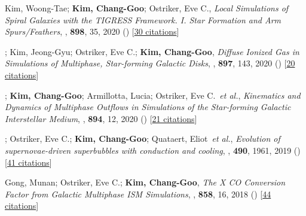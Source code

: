 \item[{14.}]Kim, Woong-Tae; \textbf{Kim, Chang-Goo}; Ostriker, Eve C., \textit{Local Simulations of Spiral Galaxies with the TIGRESS Framework. I. Star Formation and Arm Spurs/Feathers}, , \textbf{898}, 35, 2020 () [\href{http://adsabs.harvard.edu/abs/2020ApJ...898...35K}{30 citations}]

\item[{13.}]; Kim, Jeong-Gyu; Ostriker, Eve C.; \textbf{Kim, Chang-Goo}, \textit{Diffuse Ionized Gas in Simulations of Multiphase, Star-forming Galactic Disks}, , \textbf{897}, 143, 2020 () [\href{http://adsabs.harvard.edu/abs/2020ApJ...897..143K}{20 citations}]

\item[{12.}]; \textbf{Kim, Chang-Goo}; Armillotta, Lucia; Ostriker, Eve C.~\textit{et al.}, \textit{Kinematics and Dynamics of Multiphase Outflows in Simulations of the Star-forming Galactic Interstellar Medium}, , \textbf{894}, 12, 2020 () [\href{http://adsabs.harvard.edu/abs/2020ApJ...894...12V}{21 citations}]

\item[{11.}]; Ostriker, Eve C.; \textbf{Kim, Chang-Goo}; Quataert, Eliot~\textit{et al.}, \textit{Evolution of supernovae-driven superbubbles with conduction and cooling}, , \textbf{490}, 1961, 2019 () [\href{http://adsabs.harvard.edu/abs/2019MNRAS.490.1961E}{41 citations}]

\item[{10.}]Gong, Munan; Ostriker, Eve C.; \textbf{Kim, Chang-Goo}, \textit{The X CO Conversion Factor from Galactic Multiphase ISM Simulations}, , \textbf{858}, 16, 2018 () [\href{http://adsabs.harvard.edu/abs/2018ApJ...858...16G}{44 citations}]